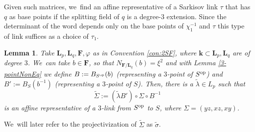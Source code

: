 \documentclass[JEP,XML,SOM,Unicode,NoFloatCountersInSection, NoEqCountersInSection,published]{cedram}
\newcommand{\op}{\textup{op}}
\newtheorem{lemma}[theorem]{Lemma}
\theoremstyle{definition}
\newcommand{\kk}{{\boldsymbol{k}}}
\newcommand{\FF}{{\boldsymbol{F}}}
\newcommand{\LL}{{\boldsymbol{L}}}
\begin{document}
Given such matrices, we~find an affine representative of a Sarkisov link $\tau$ that has $q$ as base points if the splitting field of $q$ is a degree-$3$ extension. Since the determinant of the word depends only on the base points of $\chi_1^{-1}$ and $\tau$ this type of link suffices as a choice of $\tau_1$.

\begin{lemma} \label{BB'}
Take $\LL_p, \LL_q, \FF, \varphi$ as in Convention \ref{con:2SF}, where $\kk \subset \LL_p, \LL_q$ are of degree $3$. We~can take $b \in \FF$, so that $N_{\FF / \LL_q}(b) = \xi^{2}$ and with Lemma \ref{3-pointNonEq} we define $B := B_{S^{\op}}(b)$ (representing a $3$\nobreakdash-point of $S^{\op}$) and $B':=B_S(b^{-1})$ (representing a $3$\nobreakdash-point of $S$).
Then, there is a $\tilde \lambda \in L_p$ such that
\[
\tilde \Sigma := (\tilde \lambda B') \circ \Sigma \circ B^{-1}
\]
is an affine representative of a $3$\nobreakdash-link from $S^{\op}$ to $S$, where $\Sigma = (yz,xz,xy)$.
\end{lemma}

We~will later refer to the projectivization of $\tilde \Sigma$ as $\tilde \sigma$.
\end{document}
